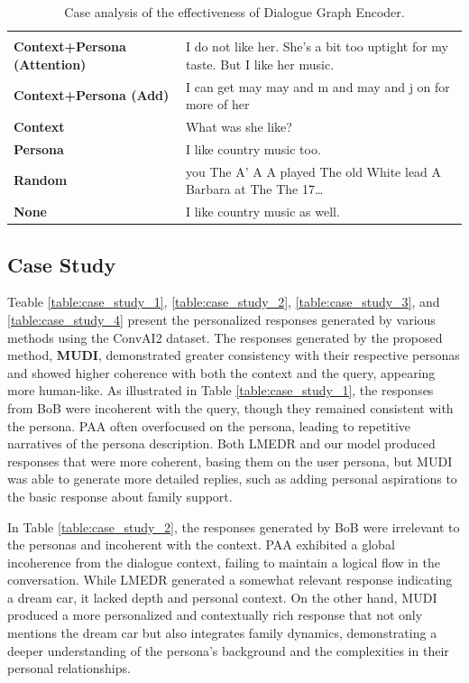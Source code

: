 \begin{table}[H]
\begin{tabular}{|p{3.5cm}|p{12cm}|}
\hhline{|==|}
\rowcolor[RGB]{204,217,245}
\multicolumn{2}{|c|}{\textbf{Response}} \\
\hhline{|==|}
\textbf{Context+Persona (Attention)} & I do not like her. She's a bit too uptight for my taste. But I like her music. \\
\textbf{Context+Persona (Add)} & I can get may may and m and may and j on for more of her \\
\textbf{Context} &  What was she like? \\
\textbf{Persona} & I like country music too. \\
\textbf{Random} & you The A’ A A played The old White lead A Barbara at The The 17… \\
\textbf{None} & I like country music as well. \\

\hline
\end{tabular}
\caption{Case analysis of the effectiveness of Dialogue Graph Encoder.}
\label{table:case_study_effectiveness_of_dialogue_graph_encoder}
\end{table}

\subsection{Case Study}
Teable \ref{table:case_study_1}, \ref{table:case_study_2}, \ref{table:case_study_3}, and \ref{table:case_study_4} present the personalized responses generated by various methods using the ConvAI2 dataset. The responses generated by the proposed method, \textbf{MUDI}, demonstrated greater consistency with their respective personas and showed higher coherence with both the context and the query, appearing more human-like. As illustrated in Table \ref{table:case_study_1}, the responses from BoB were incoherent with the query, though they remained consistent with the persona. PAA often overfocused on the persona, leading to repetitive narratives of the persona description. Both LMEDR and our model produced responses that were more coherent, basing them on the user persona, but MUDI was able to generate more detailed replies, such as adding personal aspirations to the basic response about family support. 

In Table \ref{table:case_study_2}, the responses generated by BoB were irrelevant to the personas and incoherent with the context. PAA exhibited a global incoherence from the dialogue context, failing to maintain a logical flow in the conversation. While LMEDR generated a somewhat relevant response indicating a dream car, it lacked depth and personal context. On the other hand, MUDI produced a more personalized and contextually rich response that not only mentions the dream car but also integrates family dynamics, demonstrating a deeper understanding of the persona's background and the complexities in their personal relationships. 

